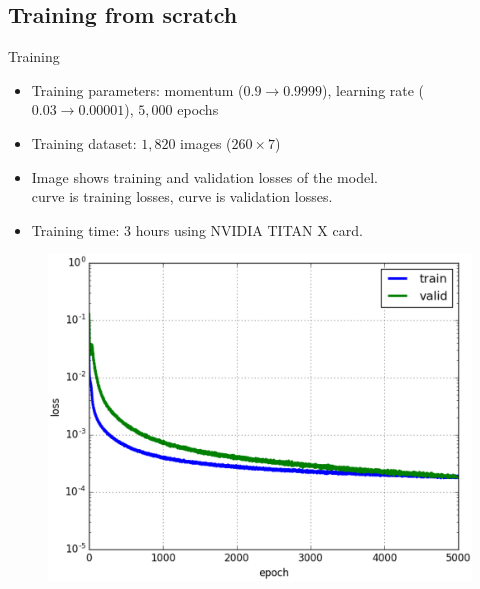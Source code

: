 \documentclass[10pt]{beamer}
\begin{document}
\subsection{Training from scratch}
\begin{frame}{Training}{}
	\begin{itemize}
		\item Training parameters: momentum ($0.9 \rightarrow 0.9999$), learning rate ($0.03 \rightarrow 0.00001$), $5,000$ epochs\footnotemark
		\item Training dataset: $1,820$ images ($260 \times 7$)
		\item Image shows training and validation losses of the model.\\ \small{\color{blue}{Blue} curve is training losses, \color{green}{green} curve is validation losses.}
		\item Training time: 3 hours using NVIDIA TITAN X card.
	\end{itemize}
	\begin{center}
     \begin{figure}[htbp]
        \centering
        \includegraphics[scale=.30]{images/loss_model_3}
    	\label{figrsexample1}
	\end{figure}
  \end{center}
	
\end{frame}

\end{document}
